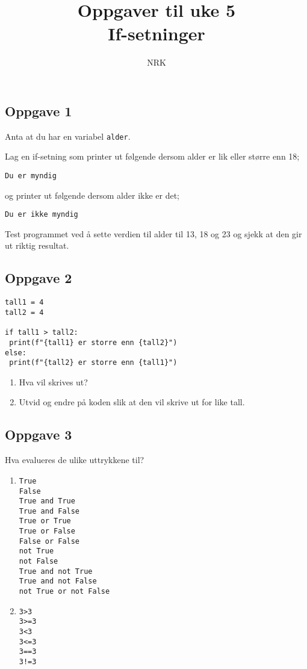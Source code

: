 \documentclass{article}
\title{Oppgaver til uke 5 \\ If-setninger}
\author{NRK}
\date{}
\begin{document}
\maketitle
\noindent

\subsection*{Oppgave 1}
Anta at du har en variabel \texttt{alder}.

Lag en if-setning som printer ut følgende dersom alder er lik eller større enn 18;
\begin{verbatim}
Du er myndig
\end{verbatim}

og printer ut følgende dersom alder ikke er det;
\begin{verbatim}
Du er ikke myndig
\end{verbatim}

Test programmet ved å sette verdien til alder til 13, 18 og 23 og sjekk at den gir ut riktig resultat.

\subsection*{Oppgave 2}

\begin{verbatim}
tall1 = 4
tall2 = 4

if tall1 > tall2:
 print(f"{tall1} er storre enn {tall2}")
else:
 print(f"{tall2} er storre enn {tall1}")
 \end{verbatim}
 
 \begin{enumerate}
 \item Hva vil skrives ut?
 \item Utvid og endre på koden slik at den vil skrive ut for like tall.
 \end{enumerate}
 


\subsection*{Oppgave 3}
Hva evalueres de ulike uttrykkene til?
\begin{enumerate}
\item 
\begin{verbatim}
True
False
True and True
True and False
True or True
True or False	
False or False
not True 
not False
True and not True
True and not False
not True or not False
\end{verbatim}

\item
\begin{verbatim}
3>3 
3>=3
3<3 
3<=3
3==3
3!=3
\end{verbatim}
\end{enumerate}
\end{document}
